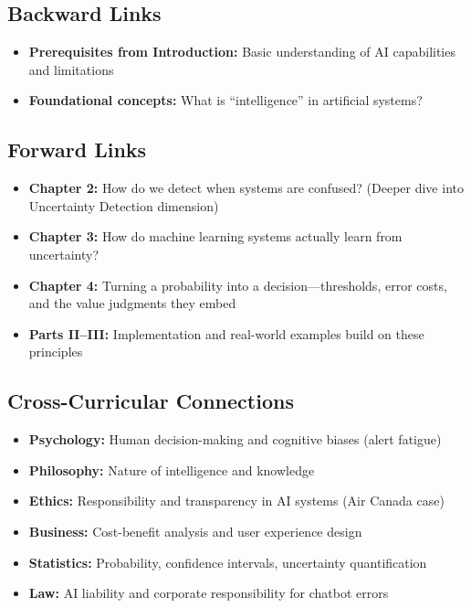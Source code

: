 \subsection{Backward Links}
\begin{itemize}
    \item \textbf{Prerequisites from Introduction:} Basic understanding of AI capabilities and limitations
    \item \textbf{Foundational concepts:} What is ``intelligence'' in artificial systems?
\end{itemize}

\subsection{Forward Links}
\begin{itemize}
    \item \textbf{Chapter 2:} How do we detect when systems are confused? (Deeper dive into Uncertainty Detection dimension)
    \item \textbf{Chapter 3:} How do machine learning systems actually learn from uncertainty?
    \item \textbf{Chapter 4:} Turning a probability into a decision---thresholds, error costs, and the value judgments they embed
    \item \textbf{Parts II--III:} Implementation and real-world examples build on these principles
\end{itemize}

\subsection{Cross-Curricular Connections}
\begin{itemize}
    \item \textbf{Psychology:} Human decision-making and cognitive biases (alert fatigue)
    \item \textbf{Philosophy:} Nature of intelligence and knowledge
    \item \textbf{Ethics:} Responsibility and transparency in AI systems (Air Canada case)
    \item \textbf{Business:} Cost-benefit analysis and user experience design
    \item \textbf{Statistics:} Probability, confidence intervals, uncertainty quantification
    \item \textbf{Law:} AI liability and corporate responsibility for chatbot errors
\end{itemize}

